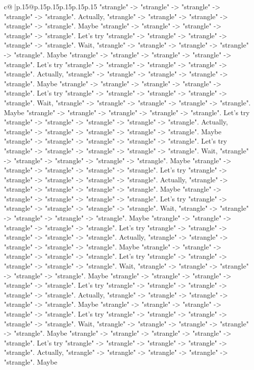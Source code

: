 \documentclass{article}
\begin{document}
{\begin{supertabular}{c@{$\;$}|p{.15\linewidth}@{}p{.15\linewidth}p{.15\linewidth}p{.15\linewidth}p{.15\linewidth}p{.15\linewidth}}
{{{"strangle" {-}> "strangle" {-}> "strangle" {-}> "strangle" {-}> "strangle". Actually, "strangle" {-}> "strangle" {-}> "strangle" {-}> "strangle" {-}> "strangle". Maybe "strangle" {-}> "strangle" {-}> "strangle" {-}> "strangle" {-}> "strangle". Let's try "strangle" {-}> "strangle" {-}> "strangle" {-}> "strangle" {-}> "strangle". Wait, "strangle" {-}> "strangle" {-}> "strangle" {-}> "strangle" {-}> "strangle". Maybe "strangle" {-}> "strangle" {-}> "strangle" {-}> "strangle" {-}> "strangle". Let's try "strangle" {-}> "strangle" {-}> "strangle" {-}> "strangle" {-}> "strangle". Actually, "strangle" {-}> "strangle" {-}> "strangle" {-}> "strangle" {-}> "strangle". Maybe "strangle" {-}> "strangle" {-}> "strangle" {-}> "strangle" {-}> "strangle". Let's try "strangle" {-}> "strangle" {-}> "strangle" {-}> "strangle" {-}> "strangle". Wait, "strangle" {-}> "strangle" {-}> "strangle" {-}> "strangle" {-}> "strangle". Maybe "strangle" {-}> "strangle" {-}> "strangle" {-}> "strangle" {-}> "strangle". Let's try "strangle" {-}> "strangle" {-}> "strangle" {-}> "strangle" {-}> "strangle". Actually, "strangle" {-}> "strangle" {-}> "strangle" {-}> "strangle" {-}> "strangle". Maybe "strangle" {-}> "strangle" {-}> "strangle" {-}> "strangle" {-}> "strangle". Let's try "strangle" {-}> "strangle" {-}> "strangle" {-}> "strangle" {-}> "strangle". Wait, "strangle" {-}> "strangle" {-}> "strangle" {-}> "strangle" {-}> "strangle". Maybe "strangle" {-}> "strangle" {-}> "strangle" {-}> "strangle" {-}> "strangle". Let's try "strangle" {-}> "strangle" {-}> "strangle" {-}> "strangle" {-}> "strangle". Actually, "strangle" {-}> "strangle" {-}> "strangle" {-}> "strangle" {-}> "strangle". Maybe "strangle" {-}> "strangle" {-}> "strangle" {-}> "strangle" {-}> "strangle". Let's try "strangle" {-}> "strangle" {-}> "strangle" {-}> "strangle" {-}> "strangle". Wait, "strangle" {-}> "strangle" {-}> "strangle" {-}> "strangle" {-}> "strangle". Maybe "strangle" {-}> "strangle" {-}> "strangle" {-}> "strangle" {-}> "strangle". Let's try "strangle" {-}> "strangle" {-}> "strangle" {-}> "strangle" {-}> "strangle". Actually, "strangle" {-}> "strangle" {-}> "strangle" {-}> "strangle" {-}> "strangle". Maybe "strangle" {-}> "strangle" {-}> "strangle" {-}> "strangle" {-}> "strangle". Let's try "strangle" {-}> "strangle" {-}> "strangle" {-}> "strangle" {-}> "strangle". Wait, "strangle" {-}> "strangle" {-}> "strangle" {-}> "strangle" {-}> "strangle". Maybe "strangle" {-}> "strangle" {-}> "strangle" {-}> "strangle" {-}> "strangle". Let's try "strangle" {-}> "strangle" {-}> "strangle" {-}> "strangle" {-}> "strangle". Actually, "strangle" {-}> "strangle" {-}> "strangle" {-}> "strangle" {-}> "strangle". Maybe "strangle" {-}> "strangle" {-}> "strangle" {-}> "strangle" {-}> "strangle". Let's try "strangle" {-}> "strangle" {-}> "strangle" {-}> "strangle" {-}> "strangle". Wait, "strangle" {-}> "strangle" {-}> "strangle" {-}> "strangle" {-}> "strangle". Maybe "strangle" {-}> "strangle" {-}> "strangle" {-}> "strangle" {-}> "strangle". Let's try "strangle" {-}> "strangle" {-}> "strangle" {-}> "strangle" {-}> "strangle". Actually, "strangle" {-}> "strangle" {-}> "strangle" {-}> "strangle" {-}> "strangle". Maybe }}}
\end{supertabular}}
\end{document}
